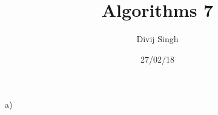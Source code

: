 \documentclass{article}
\title{Algorithms 7}
\author{Divij Singh}
\date{27/02/18}
\begin{document}
	\maketitle
	
	\section{}
	a) 
	
\end{document}
